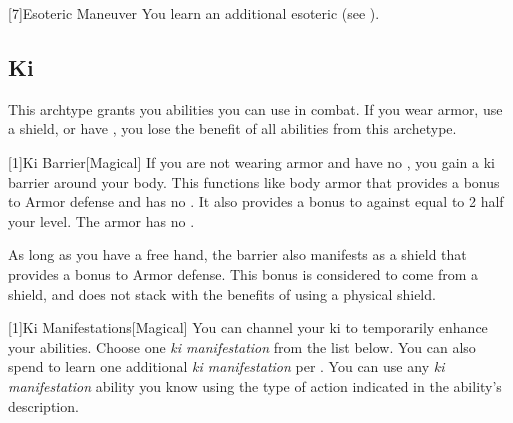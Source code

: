         [7]{Esoteric Maneuver} You learn an additional esoteric  (see ).

    \subsection{Ki}
        This archtype grants you abilities you can use in combat.
        If you wear armor, use a shield, or have , you lose the benefit of all abilities from this archetype.

        [1]{Ki Barrier}[Magical]
        If you are not wearing armor and have no , you gain a ki barrier around your body.
        This functions like body armor that provides a  bonus to Armor defense and has no .
        It also provides a bonus to  against  equal to 2 \add half your level.
        The armor has no .

        As long as you have a free hand, the barrier also manifests as a shield that provides a  bonus to Armor defense.
        This bonus is considered to come from a shield, and does not stack with the benefits of using a physical shield.

        [1]{Ki Manifestations}[Magical]
        You can channel your ki to temporarily enhance your abilities.
        Choose one \textit{ki manifestation} from the list below.
        You can also spend  to learn one additional \textit{ki manifestation} per .
        You can use any \textit{ki manifestation} ability you know using the type of action indicated in the ability's description.

